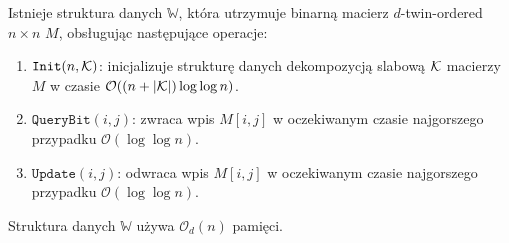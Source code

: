 \documentclass[runningheads]{llncs}
\newcommand{\Oh}{\mathcal{O}}
\begin{document}
\begin{theorem}\label{thm:wc}
Istnieje struktura danych $\mathbb{W}$, która utrzymuje
binarną macierz $d$-twin-ordered $n\times n$ $M$,
obsługując następujące operacje:
\begin{enumerate}
 \item $\mathtt{Init}(n, \cal K)$: inicjalizuje strukturę danych
 dekompozycją slabową $\cal K$ macierzy $M$ w
 czasie $\Oh((n + |{\cal K}|) \log \log n)$.
 \item $\mathtt{QueryBit}(i,j)$: zwraca wpis $M[i, j]$ w
 oczekiwanym czasie najgorszego przypadku $\Oh(\log \log n)$.
 \item $\mathtt{Update}(i, j)$: odwraca wpis $M[i, j]$ w
 oczekiwanym czasie najgorszego przypadku $\Oh(\log \log n)$.
\end{enumerate}
Struktura danych $\mathbb{W}$ używa $\Oh_d(n)$ pamięci.
\end{theorem}
\end{document}
